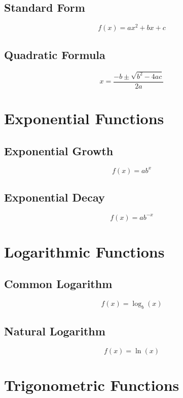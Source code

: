 \documentclass{book}
\begin{document}
\subsection{Standard Form}
\begin{equation}
    f(x) = ax^2 + bx + c
\end{equation}

\subsection{Quadratic Formula}
\begin{equation}
	x = \frac{-b \pm \sqrt{b^2 - 4ac}}{2a}
\end{equation}

\section{Exponential Functions}
\subsection{Exponential Growth}
\begin{equation}
    f(x) = ab^x
\end{equation}

\subsection{Exponential Decay}
\begin{equation}
    f(x) = ab^{-x}
\end{equation}

\section{Logarithmic Functions}
\subsection{Common Logarithm}
\begin{equation}
    f(x) = \log_b(x)
\end{equation}

\subsection{Natural Logarithm}
\begin{equation}
    f(x) = \ln(x)
\end{equation}

\section{Trigonometric Functions}
\end{document}
